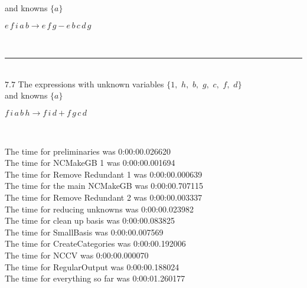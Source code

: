 \documentclass[rep10,leqno]{report}
\begin{document}
and knowns $\{a\}$\smallskip\\
\begin{minipage}{6in}
$
e\,
 f\,
 i\,
 a\,
 b\rightarrow e\,
 f\,
 g - e\,
 b\,
 c\,
 d\,
 g
$
\end{minipage}\\
\rule[3pt]{6in}{.7pt}\\
$7.7$  The expressions with unknown variables $\{1,
$ $
h,
$ $
b,
$ $
g,
$ $
c,
$ $
f,
$ $
d\}$\\
and knowns $\{a\}$\smallskip\\
\begin{minipage}{6in}
$
f\,
 i\,
 a\,
 b\,
 h\rightarrow f\,
 i\,
 d + f\,
 g\,
 c\,
 d
$
\end{minipage}\\
\vspace{10pt}

\noindent
The time for preliminaries was 0:00:00.026620\\
The time for NCMakeGB 1 was 0:00:00.001694\\
The time for Remove Redundant 1 was 0:00:00.000639\\
The time for the main NCMakeGB was 0:00:00.707115\\
The time for Remove Redundant 2 was 0:00:00.003337\\
The time for reducing unknowns was 0:00:00.023982\\
The time for clean up basis was 0:00:00.083825\\
The time for SmallBasis was 0:00:00.007569\\
The time for CreateCategories was 0:00:00.192006\\
The time for NCCV was 0:00:00.000070\\
The time for RegularOutput was 0:00:00.188024\\
The time for everything so far was 0:00:01.260177\\
\end{document}
